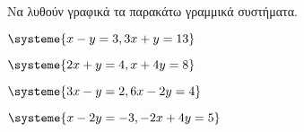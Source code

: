 Να λυθούν γραφικά τα παρακάτω γραμμικά συστήματα.
\begin{multicols}{2}
\begin{rlist}[leftmargin=5mm]
\item $ \systeme{x-y=3,3x+y=13} $
\item $ \systeme{2x+y=4,x+4y=8} $
\item $ \systeme{3x-y=2,6x-2y=4} $
\item $ \systeme{x-2y=-3,-2x+4y=5} $
\end{rlist}
\end{multicols}
